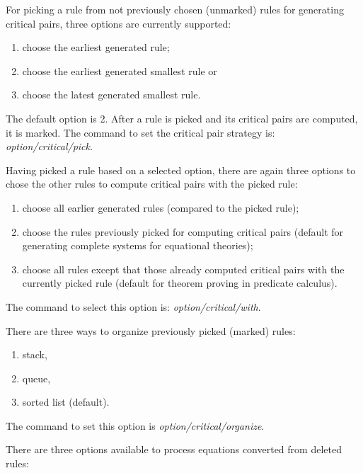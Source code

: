 For picking a rule from
not previously chosen (unmarked) rules for generating critical pairs, three options
are currently supported: 
\begin{enumerate}
\item choose the earliest generated rule; 
\item choose the earliest generated smallest rule or
\item choose the latest generated smallest rule.  
\end{enumerate}
The default option is 2. 
After a rule is picked and its critical pairs are computed, it is marked.
The command to set the critical pair strategy is:
{\em option/critical/pick}.
  
Having picked a rule based on a selected option, 
there are again three options to chose the 
other rules to compute critical pairs with the picked rule: 
\begin{enumerate}
\item choose all earlier generated rules (compared to the picked rule);
\item choose the rules previously picked for computing critical pairs (default for generating complete systems for equational
theories);
\item choose all rules except that those already
computed critical pairs with the currently picked rule (default
for theorem proving in predicate calculus).
\end{enumerate}
The command to select this option is: {\em option/critical/with}.
  
There are three ways to organize previously picked (marked) rules: 
\begin{enumerate}
\item stack, 
\item queue, 
\item sorted list (default). 
\end{enumerate}
The command to set this option is {\em option/critical/organize}. 

There are three options available to process equations converted from
deleted rules:

